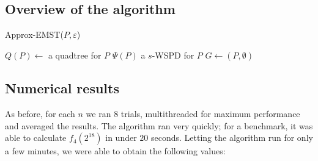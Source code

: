 \documentclass[a4paper, 10pt, twocolumn, twoside]{article}
\begin{document}
\subsection{Overview of the algorithm}

\begin{algorithm}
\caption{Approx-EMST($P, \varepsilon$)}
\DontPrintSemicolon
$Q(P) \leftarrow $ a quadtree for $P$\;
$\Psi(P)$ a $s$-WSPD for $P$\;
$G\leftarrow(P,\emptyset)$ 
 



\end{algorithm}


\subsection{Numerical results}
As before, for each $n$ we ran $8$ trials, multithreaded for maximum performance and averaged the results. The algorithm ran very quickly; for a benchmark, it was able to calculate $f_4(2^{18})$ in under $20$ seconds. Letting the algorithm run for only a few minutes, we were able to obtain the following values:
\end{document}
